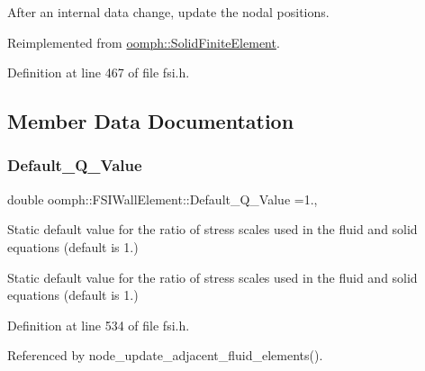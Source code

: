 After an internal data change, update the nodal positions. 



Reimplemented from \hyperlink{classoomph_1_1SolidFiniteElement_a84d5c177b27570c35dd7693b913c00a5}{oomph\+::\+Solid\+Finite\+Element}.



Definition at line 467 of file fsi.\+h.



\subsection{Member Data Documentation}
\mbox{\label{classoomph_1_1FSIWallElement_ac55ce8829f73fe16f4245fa7c0f2cd54}} 
\subsubsection{\texorpdfstring{Default\+\_\+\+Q\+\_\+\+Value}{Default\_Q\_Value}}
{\footnotesize\ttfamily double oomph\+::\+F\+S\+I\+Wall\+Element\+::\+Default\+\_\+\+Q\+\_\+\+Value =1.\hspace{0.3cm}{\ttfamily [static]}, {\ttfamily [private]}}



Static default value for the ratio of stress scales used in the fluid and solid equations (default is 1.) 

Static default value for the ratio of stress scales used in the fluid and solid equations (default is 1.) 

Definition at line 534 of file fsi.\+h.



Referenced by node\+\_\+update\+\_\+adjacent\+\_\+fluid\+\_\+elements().

\mbox{\label{classoomph_1_1FSIWallElement_ae7bc07beb09c423ac625a1419644519b}} 
